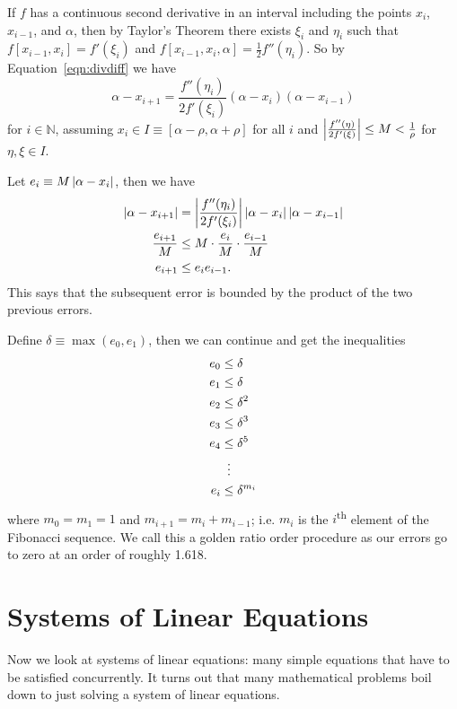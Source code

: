\documentclass[12pt,letterpaper,DIV=11]{scrartcl}
\theoremstyle{plain}
\theoremstyle{definition}
\theoremstyle{remark}
\begin{document}
If $f$ has a continuous second derivative in an interval including the points $x_i$, $x_{i - 1}$, and $\alpha$, then by Taylor's Theorem there exists $\xi_i$ and $\eta_i$  such that $f[x_{i - 1}, x_i] = f'(\xi_i)$ and $f[x_{i - 1}, x_i, \alpha] = \frac{1}{2} f''(\eta_i)$.
So by Equation~\ref{eqn:divdiff} we have \begin{displaymath}
  \alpha - x_{i + 1} = \frac{f''(\eta_i)}{2 f'(\xi_i)} (\alpha - x_i) (\alpha - x_{i - 1})
\end{displaymath} for $i \in \mathbb{N}$,
assuming $x_i \in I \equiv [\alpha - \rho, \alpha + \rho]$ for all $i$ and
$\left\lvert\frac{f''(\eta)}{2 f'(\xi)}\right\rvert \leq M < \frac{1}{\rho}$ for $\eta, \xi \in I$.

Let $e_i \equiv M \left\lvert\alpha - x_i\right\rvert$, then we have \begin{align*}
  \left\lvert\alpha - x_{i + 1}\right\rvert &= \left\lvert\frac{f''(\eta_i)}{2 f'(\xi_i)}\right\rvert \left\lvert\alpha - x_i\right\rvert \left\lvert\alpha - x_{i - 1}\right\rvert \\
  \frac{e_{i + 1}}{M} &\leq M \cdot \frac{e_i}{M} \cdot \frac{e_{i - 1}}{M} \\
  e_{i + 1} &\leq e_i e_{i - 1}.
\end{align*}
This says that the subsequent error is bounded by the product of the two previous errors.

Define $\delta \equiv \max(e_0, e_1)$, then we can continue and get the inequalities \begin{align*}
  e_0 &\leq \delta \\
  e_1 &\leq \delta \\
  e_2 &\leq \delta^2 \\
  e_3 &\leq \delta^3 \\
  e_4 &\leq \delta^5 \\
      &\vdotswithin{\leq} \\
  e_i &\leq \delta^{m_i}
\end{align*} where $m_0 = m_1 = 1$ and $m_{i + 1} = m_i + m_{i - 1}$; i.e. $m_i$ is the $i$\textsuperscript{th} element of the Fibonacci sequence.
We call this a golden ratio order procedure as our errors go to zero at an order of roughly 1.618.

\section{Systems of Linear Equations}
Now we look at systems of linear equations: many simple equations that have to be satisfied concurrently.
It turns out that many mathematical problems boil down to just solving a system of linear equations.
\end{document}
